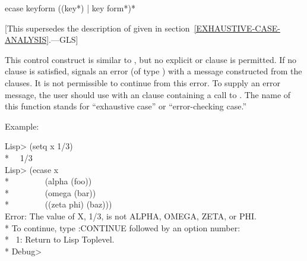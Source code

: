 \begin{defmac}
ecase keyform {({({key}*) | key} {form}*)}*

   [This supersedes the description of 
   given in section~\ref{EXHAUSTIVE-CASE-ANALYSIS}.---GLS]

  This control construct is similar to , but no explicit  or 
  clause is permitted. If no clause is satisfied,  signals an error
  (of type ) with a message constructed from the clauses. It is not
  permissible to continue from this error. To supply an error message, the
  user should use  with an  clause containing a call to .
  The name of this function stands for ``exhaustive case'' or ``error-checking
  case.''

Example:
\begin{lisp}
Lisp> (setq x 1/3) \\*
~\EV\ 1/3 \\
Lisp> (ecase x \\*
~~~~~~~~(alpha (foo)) \\*
~~~~~~~~(omega (bar)) \\*
~~~~~~~~((zeta phi) (baz))) \\
Error: The value of X, 1/3, is not ALPHA, OMEGA, ZETA, or PHI. \\*
To continue, type :CONTINUE followed by an option number: \\*
~1: Return to Lisp Toplevel. \\*
Debug>
\end{lisp}
\end{defmac}

